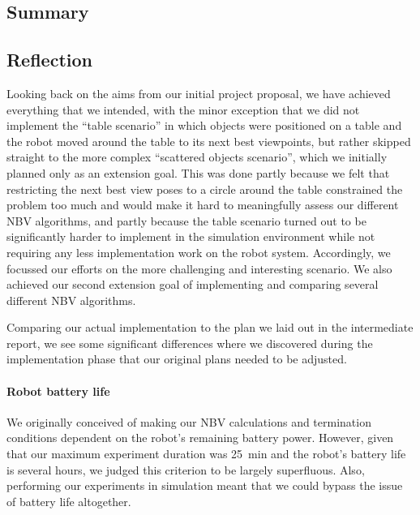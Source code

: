 

\subsection{Summary}

\subsection{Reflection}

Looking back on the aims from our initial project proposal, we have achieved everything that we intended, with the minor exception that we did not implement the ``table scenario'' in which objects were positioned on a table and the robot moved around the table to its next best viewpoints, but rather skipped straight to the more complex ``scattered objects scenario'', which we initially planned only as an extension goal.
This was done partly because we felt that restricting the next best view poses to a circle around the table constrained the problem too much and would make it hard to meaningfully assess our different NBV algorithms, and partly because the table scenario turned out to be significantly harder to implement in the simulation environment while not requiring any less implementation work on the robot system.
Accordingly, we focussed our efforts on the more challenging and interesting scenario.
We also achieved our second extension goal of implementing and comparing several different NBV algorithms.

Comparing our actual implementation to the plan we laid out in the intermediate report, we see some significant differences where we discovered during the implementation phase that our original plans needed to be adjusted.

\paragraph{Robot battery life} %
\label{par:robot_battery_life}

We originally conceived of making our NBV calculations and termination conditions dependent on the robot's remaining battery power.
However, given that our maximum experiment duration was \SI{25}{\minute} and the robot's battery life is several hours, we judged this criterion to be largely superfluous.
Also, performing our experiments in simulation meant that we could bypass the issue of battery life altogether.

